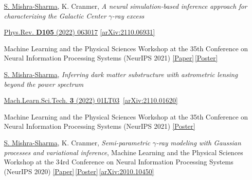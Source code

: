 \documentclass[letterpaper,11pt]{article}
\newenvironment{packed_itemize}{
\begin{itemize}[label=\raisebox{0.25ex}{\tiny$\bullet$}]
  \setlength{\itemsep}{4.2pt}
  \setlength{\parskip}{0pt}
  \setlength{\parsep}{0pt}}{\end{itemize}
}
\newenvironment{packed_enumerate}[1][]{
\begin{etaremune}[#1]
  \setlength{\itemsep}{3.7pt}
  \setlength{\parskip}{0pt}
  \setlength{\parsep}{0pt}}{\end{etaremune}
}
\begin{document}
\begin{packed_enumerate}[start=38]
  \item  \underline{S. Mishra-Sharma}, K. Cranmer, \emph{A neural simulation-based inference approach for characterizing the Galactic Center $\gamma$-ray excess}
    \begin{packed_itemize}
      \item {\href{https://journals.aps.org/prd/abstract/10.1103/PhysRevD.105.063017}{Phys.Rev. \textbf{D105} (2022) 063017} \href{https://arxiv.org/abs/2110.06931}{[arXiv:2110.06931]}}
      \item {Machine Learning and the Physical Sciences Workshop at the 35th Conference on Neural Information Processing Systems (NeurIPS 2021) \href{https://ml4physicalsciences.github.io/2020/files/NeurIPS_ML4PS_2020_20.pdf}{[Paper]}\,\href{https://ml4physicalsciences.github.io/2020/files/NeurIPS_ML4PS_2020_20_poster.pdf}{[Poster]}}
    \end{packed_itemize}


  \item \underline{S. Mishra-Sharma}, \emph{Inferring dark matter substructure with astrometric lensing beyond the power spectrum}  
  \begin{packed_itemize}
    \item {\href{https://doi.org/10.1088/2632-2153/ac494a}{Mach.Learn.Sci.Tech. \textbf{3} (2022) 01LT03} \,\href{https://arxiv.org/abs/2110.01620}{[arXiv:2110.01620]}}
    \item {{Machine Learning and the Physical Sciences Workshop at the 35th Conference on Neural Information Processing Systems (NeurIPS 2021)} \href{https://ml4physicalsciences.github.io/2021/files/NeurIPS_ML4PS_2021_22_poster.png}{[Poster]}}
    \end{packed_itemize}

  \item\underline{S. Mishra-Sharma}, K. Cranmer, \emph{Semi-parametric $\gamma$-ray modeling with Gaussian processes and variational inference}, {Machine Learning and the Physical Sciences Workshop at the 34rd Conference on Neural Information Processing Systems (NeurIPS 2020)} \href{https://ml4physicalsciences.github.io/2020/files/NeurIPS_ML4PS_2020_20.pdf}{[Paper]}\,\href{https://ml4physicalsciences.github.io/2020/files/NeurIPS_ML4PS_2020_20_poster.pdf}{[Poster]}\,\href{https://arxiv.org/abs/2010.10450}{[arXiv:2010.10450]} 


\end{packed_enumerate}
\end{document}
